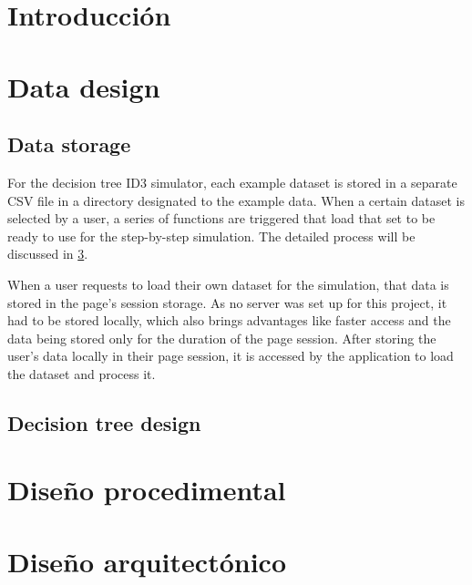 
\section{Introducción}

\section{Data design}
\subsection{Data storage}
For the decision tree ID3 simulator, each example dataset is stored in a separate CSV file in a directory designated to the example data. When a certain dataset is selected by a user, a series of functions are triggered that load that set to be ready to use for the step-by-step simulation. The detailed process will be discussed in \ref{proc_design}. 

When a user requests to load their own dataset for the simulation, that data is stored in the page's session storage. As no server was set up for this project, it had to be stored locally, which also brings advantages like faster access and the data being stored only for the duration of the page session. After storing the user's data locally in their page session, it is accessed by the application to load the dataset and process it.

\subsection{Decision tree design}

\section{Diseño procedimental} \label{proc_design}

\section{Diseño arquitectónico}